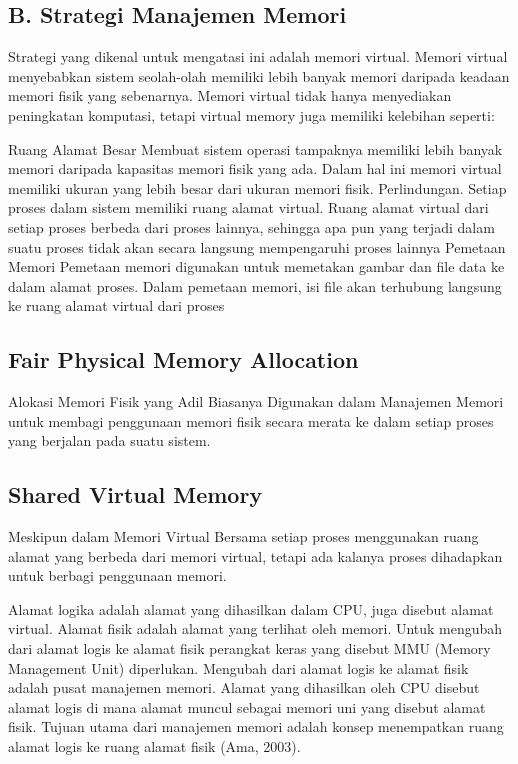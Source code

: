 \subsection {B. Strategi Manajemen Memori}
Strategi yang dikenal untuk mengatasi ini adalah memori virtual. Memori virtual menyebabkan sistem seolah-olah memiliki lebih banyak memori daripada keadaan memori fisik yang sebenarnya. Memori virtual tidak hanya menyediakan peningkatan komputasi, tetapi virtual memory juga memiliki kelebihan seperti:

Ruang Alamat Besar
Membuat sistem operasi tampaknya memiliki lebih banyak memori daripada kapasitas memori fisik yang ada. Dalam hal ini memori virtual memiliki ukuran yang lebih besar dari ukuran memori fisik.
Perlindungan.
Setiap proses dalam sistem memiliki ruang alamat virtual. Ruang alamat virtual dari setiap proses berbeda dari proses lainnya, sehingga apa pun yang terjadi dalam suatu proses tidak akan secara langsung mempengaruhi proses lainnya
Pemetaan Memori
Pemetaan memori digunakan untuk memetakan gambar dan file data ke dalam alamat proses. Dalam pemetaan memori, isi file akan terhubung langsung ke ruang alamat virtual dari proses

\subsection {Fair Physical Memory Allocation}
Alokasi Memori Fisik yang Adil Biasanya Digunakan dalam Manajemen Memori untuk membagi penggunaan memori fisik secara merata ke dalam setiap proses yang berjalan pada suatu sistem.

\subsection {Shared Virtual Memory}
Meskipun dalam Memori Virtual Bersama setiap proses menggunakan ruang alamat yang berbeda dari memori virtual, tetapi ada kalanya proses dihadapkan untuk berbagi penggunaan memori.

Alamat logika adalah alamat yang dihasilkan dalam CPU, juga disebut alamat virtual. Alamat fisik adalah alamat yang terlihat oleh memori. Untuk mengubah dari alamat logis ke alamat fisik perangkat keras yang disebut MMU (Memory Management Unit) diperlukan. Mengubah dari alamat logis ke alamat fisik adalah pusat manajemen memori. Alamat yang dihasilkan oleh CPU disebut alamat logis di mana alamat muncul sebagai memori uni yang disebut alamat fisik. Tujuan utama dari manajemen memori adalah konsep menempatkan ruang alamat logis ke ruang alamat fisik (Ama, 2003).

